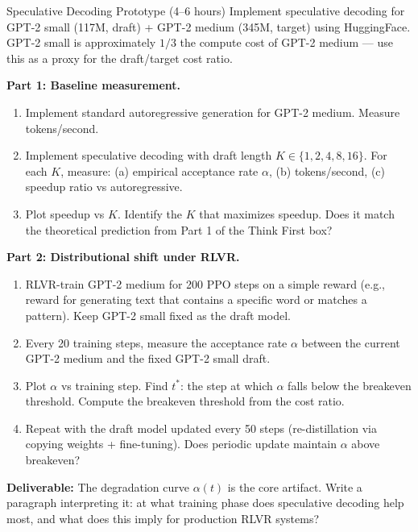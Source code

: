 \begin{exercise}{Speculative Decoding Prototype (4--6 hours)}
Implement speculative decoding for GPT-2 small (117M, draft) + GPT-2 medium (345M, target) using HuggingFace. GPT-2 small is approximately $1/3$ the compute cost of GPT-2 medium --- use this as a proxy for the draft/target cost ratio.

\textbf{Part 1: Baseline measurement.}
\begin{enumerate}
  \item Implement standard autoregressive generation for GPT-2 medium. Measure tokens/second.
  \item Implement speculative decoding with draft length $K \in \{1, 2, 4, 8, 16\}$. For each $K$, measure: (a) empirical acceptance rate $\alpha$, (b) tokens/second, (c) speedup ratio vs autoregressive.
  \item Plot speedup vs $K$. Identify the $K$ that maximizes speedup. Does it match the theoretical prediction from Part 1 of the Think First box?
\end{enumerate}

\textbf{Part 2: Distributional shift under RLVR.}
\begin{enumerate}
  \item RLVR-train GPT-2 medium for 200 PPO steps on a simple reward (e.g., reward for generating text that contains a specific word or matches a pattern). Keep GPT-2 small fixed as the draft model.
  \item Every 20 training steps, measure the acceptance rate $\alpha$ between the current GPT-2 medium and the fixed GPT-2 small draft.
  \item Plot $\alpha$ vs training step. Find $t^*$: the step at which $\alpha$ falls below the breakeven threshold. Compute the breakeven threshold from the cost ratio.
  \item Repeat with the draft model updated every 50 steps (re-distillation via copying weights + fine-tuning). Does periodic update maintain $\alpha$ above breakeven?
\end{enumerate}

\textbf{Deliverable:} The degradation curve $\alpha(t)$ is the core artifact. Write a paragraph interpreting it: at what training phase does speculative decoding help most, and what does this imply for production RLVR systems?
\end{exercise}

